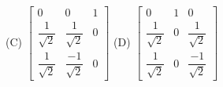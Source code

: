 \documentclass{article}
\begin{document}
																																																																																																																																					       \hspace{2cm} \\ (C) $\begin{bmatrix}
																																																																																																																																					           0 & 0 & 1 \\
																																																																																																																																						       \dfrac{1}{\sqrt{2}} & \dfrac{1}{\sqrt{2}} & 0 \\
																																																																																																																																						           \dfrac{1}{\sqrt{2}} & \dfrac{-1}{\sqrt{2}} & 0
																																																																																																																																							       \end{bmatrix}$ \hspace{2cm} (D) $\begin{bmatrix}
																																																																																																																																							           0 & 1 & 0 \\
																																																																																																																																								       \dfrac{1}{\sqrt{2}} & 0 & \dfrac{1}{\sqrt{2}} \\
																																																																																																																																								           \dfrac{1}{\sqrt{2}} & 0 & \dfrac{-1}{\sqrt{2}}
																																																																																																																																									       \end{bmatrix}$
																																																																																																																																									       \vspace{1em} \newline
\end{document}
